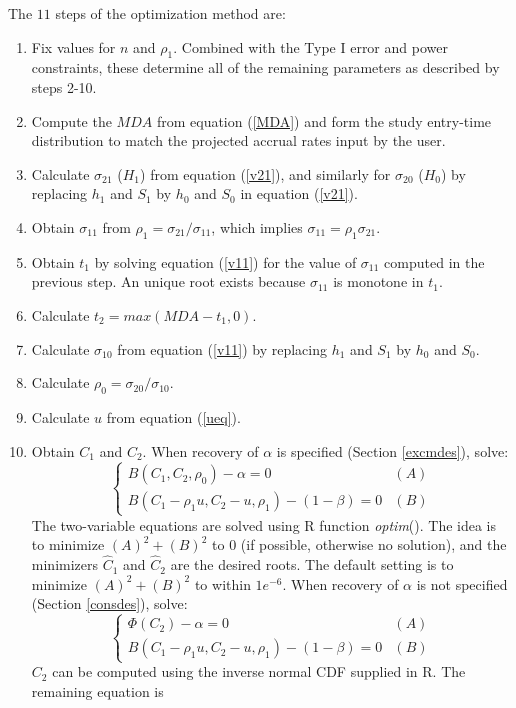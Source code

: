 \documentclass[12pt]{article}
\begin{document}
The $11$ steps of the optimization method are:
\begin{enumerate}
    \item
Fix  values for $n$ and $\rho_1$.  Combined with the Type I error and power constraints, these determine all of the remaining parameters as described by steps 2-10.
    \item
Compute the $MDA$ from equation (\ref{MDA}) and form the study entry-time distribution to match the
projected accrual rates input by the user.
    \item
Calculate $\sigma_{21}$ ($H_1$) from equation (\ref{v21}), and similarly for $\sigma_{20}$ ($H_0$) by
replacing $h_1$ and $S_1$ by $h_0$ and $S_0$ in equation (\ref{v21}).
    \item
Obtain $\sigma_{11}$ from $\rho_1=\sigma_{21}/\sigma_{11}$, which
implies $\sigma_{11}=\rho_1\sigma_{21}$.
    \item
Obtain $t_1$ by solving equation (\ref{v11}) for the value of $\sigma_{11}$  computed in the previous step. An unique root exists because
$\sigma_{11}$ is monotone in $t_1$.
    \item
Calculate $t_2=max(MDA-t_1, 0)$.
    \item
Calculate $\sigma_{10}$ from equation (\ref{v11}) by replacing $h_1$ and $S_1$ by $h_0$ and
$S_0$.
    \item
Calculate $\rho_0=\sigma_{20}/\sigma_{10}$.
    \item
Calculate $u$ from equation (\ref{ueq}).
    \item
Obtain $C_1$ and $C_2$.
When recovery of $\alpha$ is specified (Section \ref{excmdes}), solve:
$$\left\{\begin{array}{ll} B(C_1,C_2,\rho_0)-\alpha=0 & (A)\\ B(C_1-\rho_1
u,C_2-u,\rho_1)-(1-\beta)=0 & (B)
\end{array}\right.$$
The two-variable equations are solved using R function {\it optim}(). The idea is to minimize
$(A)^2+(B)^2$ to 0 (if possible, otherwise no solution), and the minimizers $\hat C_1$ and $\hat
C_2$ are the desired roots. The default setting is to minimize $(A)^2+(B)^2$ to within $1e^{-6}$.
When recovery of $\alpha$ is not specified (Section \ref{consdes}), solve:
$$\left\{\begin{array}{ll} \Phi(C_2)-\alpha=0 & (A)\\ B(C_1-\rho_1
u,C_2-u,\rho_1)-(1-\beta)=0 & (B)
\end{array}\right.$$
$C_2$ can be computed using the inverse normal CDF supplied in R.  The remaining equation is

\end{enumerate}
\end{document}
